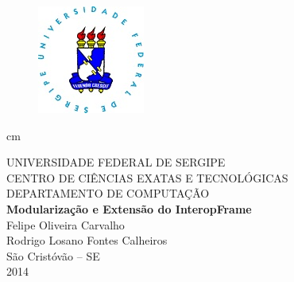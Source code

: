 

\thispagestyle{empty}
\begin{titlepage}
    \begin{figure}
        \centering
        \includegraphics[keepaspectratio = true, scale=1]{ufs.jpg} \label{fig:logoUFS}
    \end{figure}
     cm
    \begin{center}
        {\Large UNIVERSIDADE FEDERAL DE SERGIPE \\ CENTRO DE CI\^ENCIAS EXATAS E TECNOL\'OGICAS \\ DEPARTAMENTO DE COMPUTA\c{C}\~AO }\\
        \vspace{6cm}
        {\bf \LARGE Modulariza\c{c}\~ao e Extens\~ao do InteropFrame}\\
        \vspace{3cm}
        {\large Felipe Oliveira Carvalho}\\
				{\large Rodrigo Losano Fontes Calheiros}\\
        \vfill
        \large{S\~ao Crist\'ov\~ao -- SE\\ 2014}
    \end{center}



\end{titlepage}

